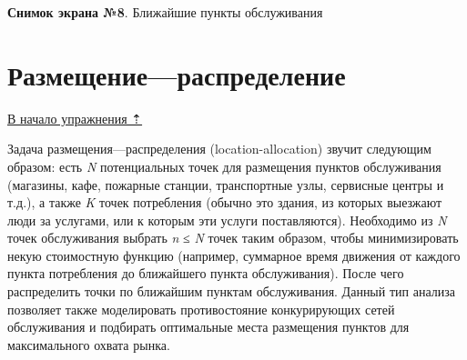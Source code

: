 \documentclass[]{book}
\theoremstyle{definition}
\theoremstyle{definition}
\theoremstyle{definition}
\theoremstyle{remark}
\begin{document}
 \textbf{Снимок экрана №8}. Ближайшие пункты обслуживания

\hypertarget{network-analysis-allocation}{%
\section{Размещение---распределение}\label{network-analysis-allocation}}

\protect\hyperlink{network-analysis}{В начало упражнения ⇡}

Задача размещения---распределения (location-allocation) звучит следующим
образом: есть \emph{N} потенциальных точек для размещения пунктов
обслуживания (магазины, кафе, пожарные станции, транспортные узлы,
сервисные центры и т.д.), а также \emph{K} точек потребления (обычно это
здания, из которых выезжают люди за услугами, или к которым эти услуги
поставляются). Необходимо из \emph{N} точек обслуживания выбрать
\emph{n} ≤ \emph{N} точек таким образом, чтобы минимизировать некую
стоимостную функцию (например, суммарное время движения от каждого
пункта потребления до ближайшего пункта обслуживания). После чего
распределить точки по ближайшим пунктам обслуживания. Данный тип анализа
позволяет также моделировать противостояние конкурирующих сетей
обслуживания и подбирать оптимальные места размещения пунктов для
максимального охвата рынка.
\end{document}
